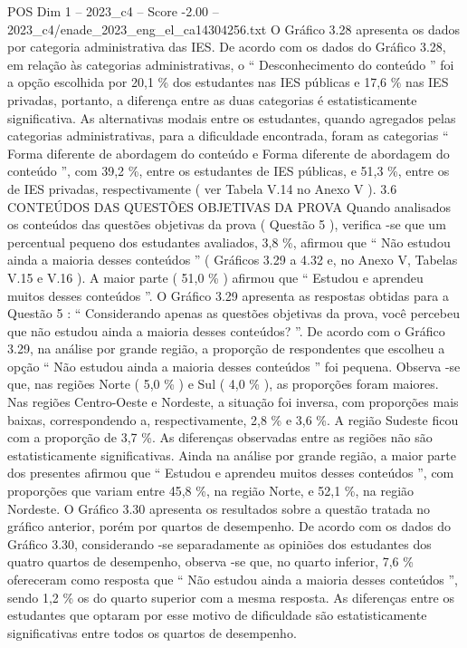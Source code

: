 \begin{textsample}{POS Dim 1 – 2023\_c4 – Score -2.00 – 2023\_c4/enade\_2023\_eng\_el\_ca14304256.txt}
O Gráfico 3.28 apresenta os dados por categoria administrativa das IES.
De acordo com os dados do Gráfico 3.28, em relação às categorias administrativas, o “ Desconhecimento do conteúdo ” foi a opção escolhida por 20,1 \% dos estudantes nas IES públicas e 17,6 \% nas IES privadas, portanto, a diferença entre as duas categorias é estatisticamente significativa.
As alternativas modais entre os estudantes, quando agregados pelas categorias administrativas, para a dificuldade encontrada, foram as categorias “ Forma diferente de abordagem do conteúdo e Forma diferente de abordagem do conteúdo ”, com 39,2 \%, entre os estudantes de IES públicas, e 51,3 \%, entre os de IES privadas, respectivamente ( ver Tabela V.14 no Anexo V ). 3.6 CONTEÚDOS DAS QUESTÕES OBJETIVAS DA PROVA Quando analisados os conteúdos das questões objetivas da prova ( Questão 5 ), verifica -se que um percentual pequeno dos estudantes avaliados, 3,8 \%, afirmou que “ Não estudou ainda a maioria desses conteúdos ” ( Gráficos 3.29 a 4.32 e, no Anexo V, Tabelas V.15 e V.16 ).
A maior parte ( 51,0 \% ) afirmou que “ Estudou e aprendeu muitos desses conteúdos ”.
O Gráfico 3.29 apresenta as respostas obtidas para a Questão 5 : “ Considerando apenas as questões objetivas da prova, você percebeu que não estudou ainda a maioria desses conteúdos? ”.
De acordo com o Gráfico 3.29, na análise por grande região, a proporção de respondentes que escolheu a opção “ Não estudou ainda a maioria desses conteúdos ” foi pequena.
Observa -se que, nas regiões Norte ( 5,0 \% ) e Sul ( 4,0 \% ), as proporções foram maiores.
Nas regiões Centro-Oeste e Nordeste, a situação foi inversa, com proporções mais baixas, correspondendo a, respectivamente, 2,8 \% e 3,6 \%.
A região Sudeste ficou com a proporção de 3,7 \%.
As diferenças observadas entre as regiões não são estatisticamente significativas.
Ainda na análise por grande região, a maior parte dos presentes afirmou que “ Estudou e aprendeu muitos desses conteúdos ”, com proporções que variam entre 45,8 \%, na região Norte, e 52,1 \%, na região Nordeste.
O Gráfico 3.30 apresenta os resultados sobre a questão tratada no gráfico anterior, porém por quartos de desempenho.
De acordo com os dados do Gráfico 3.30, considerando -se separadamente as opiniões dos estudantes dos quatro quartos de desempenho, observa -se que, no quarto inferior, 7,6 \% ofereceram como resposta que “ Não estudou ainda a maioria desses conteúdos ”, sendo 1,2 \% os do quarto superior com a mesma resposta.
As diferenças entre os estudantes que optaram por esse motivo de dificuldade são estatisticamente significativas entre todos os quartos de desempenho.

\end{textsample}
